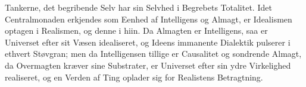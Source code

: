 \documentclass[12pt]{book}
\begin{document}
Tankerne, det begribende Selv har sin Selvhed i Begrebets Totalitet. Idet
Centralmonaden erkjendes som Eenhed af Intelligens og Almagt, er Idealismen optagen i
Realismen, og denne i hiin. Da Almagten er Intelligens, saa er Universet efter sit Væsen
idealiseret, og Ideens immanente Dialektik pulserer i ethvert Støvgran; men da
Intelligensen tillige er Causalitet og sondrende Almagt, da Overmagten kræver sine
Substrater, er Universet efter sin ydre Virkelighed realiseret, og en Verden af Ting
oplader sig for Realistens Betragtning.
\end{document}

